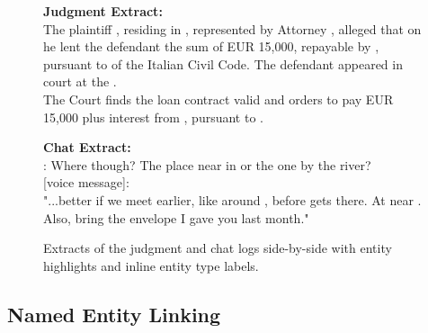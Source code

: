 \begin{figure}[htbp]
\centering
\begin{minipage}[t]{0.48\linewidth}
\ttfamily
\small
\textbf{Judgment Extract:}\\[0.5em]
The plaintiff , residing in , represented by Attorney , alleged that on  he lent the defendant  the sum of EUR 15,000, repayable by , pursuant to  of the Italian Civil Code. The defendant appeared in court at the .\\[0.5em]
The Court finds the loan contract valid and orders  to pay  EUR 15,000 plus interest from , pursuant to .\\
\end{minipage}
\hfill
\begin{minipage}[t]{0.48\linewidth}
\ttfamily
\small
\textbf{Chat Extract:}\\[0.5em]
 : Where though? The place near  in  or the one by the river?\\[0.3em]
  [voice message]: \\
"...better if we meet earlier, like around , before  gets there. At  near . Also, bring the envelope I gave you last month."\\
\end{minipage}
\caption{Extracts of the judgment and chat logs side-by-side with entity highlights and inline entity type labels.}
\label{fig:extracts-ner}
\end{figure}




\subsection{Named Entity Linking}

